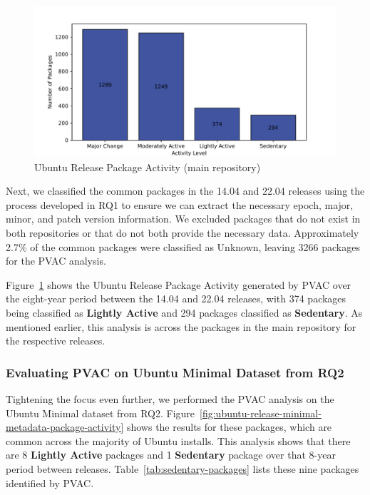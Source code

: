 \documentclass[sn-mathphys-num]{sn-jnl}%
\theoremstyle{thmstyleone}%
\theoremstyle{thmstyletwo}%
\theoremstyle{thmstylethree}%
\begin{document}
\begin{figure}
    \centering
    \includegraphics[width=1.0\linewidth]{figures/ubuntu-release-package-activity-main.pdf}
    \caption{Ubuntu Release Package Activity (main repository)}
    \label{fig:ubuntu-release-package-activity-main}
\end{figure}

Next, we classified the common packages in the 14.04 and 22.04 releases using the process developed in RQ1 to ensure we can extract the necessary epoch, major, minor, and patch version information. We excluded packages that do not exist in both repositories or that do not both provide the necessary data. Approximately 2.7\% of the common packages were classified as Unknown, leaving 3266 packages for the PVAC analysis.



Figure~\ref{fig:ubuntu-release-package-activity-main} shows the Ubuntu Release Package Activity generated by PVAC over the eight-year period between the 14.04 and 22.04 releases, with 374 packages being classified as \textbf{Lightly Active} and 294 packages classified as \textbf{Sedentary}. As mentioned earlier, this analysis is across the packages in the main repository for the respective releases.


\subsubsection{\textbf{Evaluating PVAC on Ubuntu Minimal Dataset from RQ2}}
Tightening the focus even further, we performed the PVAC analysis on the Ubuntu Minimal dataset from RQ2. Figure~\ref{fig:ubuntu-release-minimal-metadata-package-activity} shows the results for these packages, which are common across the majority of Ubuntu installs. This analysis shows that there are 8 \textbf{Lightly Active} packages and 1 \textbf{Sedentary} package over that 8-year period between releases. Table~\ref{tab:sedentary-packages} lists these nine packages identified by PVAC. 
\end{document}
